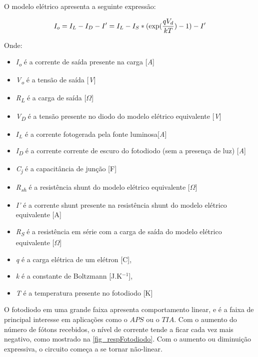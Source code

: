     O modelo el\'etrico apresenta a seguinte express\~ao:

\begin{equation}
    \label{eq_modEletFot}
    I_o = I_L - I_D - I\rq = I_L - I_S*(\exp (\frac{qV_d}{kT})-1) - I\rq
\end{equation}

Onde:
\begin{itemize}
    \item \emph{I\textsubscript{o}} \'e a corrente de saída presente na carga [\emph{A}]
    \item \emph{V\textsubscript{o}} \'e a tensão de saída [\emph{V}]
    \item \emph{R\textsubscript{L}} \'e a carga de saída [\emph{$\Omega$}]
    \item \emph{V\textsubscript{D}} \'e a tens\~ao presente no diodo do modelo el\'etrico equivalente [\emph{V}]
    \item $I_L$ \'e a corrente fotogerada pela fonte luminosa[\emph{A}]
    \item  \emph{I\textsubscript{D}} \'e a corrente corrente de escuro do fotodiodo (sem a presença de luz) [\emph{A}]
    \item \emph{C\textsubscript{j}} \'e a capacit\^ancia de junç\~ao [F]
    \item \emph{R\textsubscript{sh}} \'e a resist\^encia shunt do modelo el\'etrico equivalente [$\Omega$]
    \item \emph{I\rq} \'e a corrente shunt presente na resistência shunt do modelo el\'etrico equivalente [A]
    \item \emph{R\textsubscript{S}} \'e a resistência em s\'erie com a carga de saída do modelo el\'etrico equivalente [$\Omega$]
    \item \emph{q} \'e a carga el\'etrica de um el\'etron [C], \item \emph{k} \'e a constante de Boltzmann [J.K$^{-1}$],
    \item \emph{T} \'e a temperatura presente no fotodiodo [K]
\end{itemize}

O fotodiodo em uma grande faixa apresenta comportamento linear, e \'e a faixa de principal interesse em aplica{\c c}\~oes como o $APS$ ou o $TIA$. Com o aumento do n\'umero de f\'otons recebidos, o n\'ivel de corrente tende a ficar cada vez mais negativo, como mostrado na \autoref{fig_respFotodiodo}. Com o aumento ou diminui{\c c}\~ao expressiva, o circuito come{\c c}a a se tornar n\~ao-linear.

